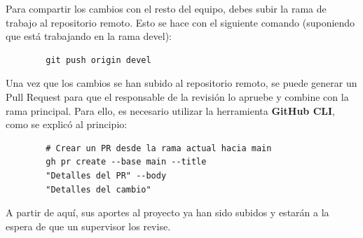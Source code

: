 \documentclass[a4paper]{article}
\begin{document}
Para compartir los cambios con el resto del equipo, debes subir la rama de trabajo al repositorio remoto. Esto se hace con el siguiente comando (suponiendo que está trabajando en la rama devel):

    \begin{lstlisting}
        git push origin devel
    \end{lstlisting}

\newpage
\thispagestyle{fancy}
Una vez que los cambios se han subido al repositorio remoto, se puede generar un Pull Request para que el responsable de la revisión lo apruebe y combine con la rama principal. Para ello, es necesario utilizar la herramienta \textbf{GitHub CLI}, como se explicó al principio:

    \begin{lstlisting}
        # Crear un PR desde la rama actual hacia main
        gh pr create --base main --title
        "Detalles del PR" --body
        "Detalles del cambio"
    \end{lstlisting}

A partir de aquí, sus aportes al proyecto ya han sido subidos y estarán a la espera de que un supervisor los revise.
\end{document}
